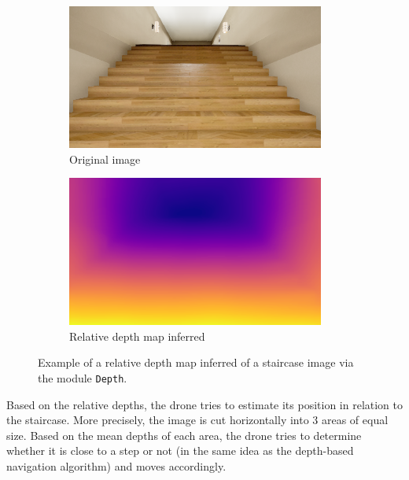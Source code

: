 \begin{figure}[H]
    \centering
    \begin{subfigure}{0.49\textwidth}
        \centering
        \includegraphics[width=\textwidth]{resources/png/06/staircase/original.png}
        \caption{Original image}
    \end{subfigure}
    \hfill
    \begin{subfigure}{0.49\textwidth}
        \centering
        \includegraphics[width=\textwidth]{resources/png/06/staircase/depth.png}
        \caption{Relative depth map inferred}
    \end{subfigure}
    \caption{Example of a relative depth map inferred of a staircase image via the module \texttt{Depth}.}
    \label{fig:06.advanced.staircase.depth}
\end{figure}

Based on the relative depths, the drone tries to estimate its position in relation to the staircase. More precisely, the image is cut horizontally into 3 areas of equal size. Based on the mean depths of each area, the drone tries to determine whether it is close to a step or not (in the same idea as the depth-based navigation algorithm) and moves accordingly.

